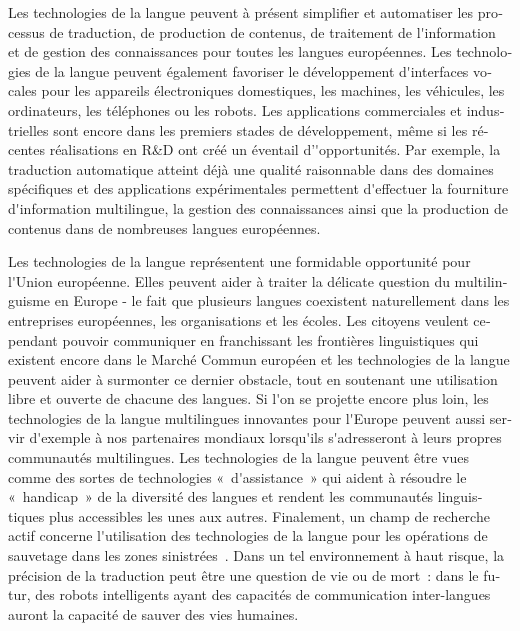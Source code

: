 \documentclass[]{../metanetpaper}
\begin{document}
\begin{french}
\begin{multicols}{2}
Les technologies de la langue peuvent à présent simplifier et
automatiser les processus de traduction, de production de contenus, de
traitement de l{\mbox '}information et de gestion des connaissances
pour toutes les langues européennes. Les technologies de la langue
peuvent également favoriser le développement d{\mbox '}interfaces
vocales pour les appareils électroniques domestiques, les machines,
les véhicules, les ordinateurs, les téléphones ou les robots. Les applications
commerciales et industrielles sont encore dans les premiers stades de
développement, même si les récentes réalisations en R\&D ont créé un
éventail d'{\mbox '}opportunités. Par exemple, la traduction
automatique atteint déjà une qualité raisonnable dans des domaines
spécifiques et des applications expérimentales permettent d{\mbox
 '}effectuer la fourniture d{\mbox '}information multilingue, la
gestion des connaissances ainsi que la production de contenus dans de
nombreuses langues européennes.


Les technologies de la langue représentent une formidable opportunité
pour l{\mbox '}Union européenne. Elles peuvent aider à traiter la
délicate question du multilinguisme en Europe - le fait que plusieurs
langues coexistent naturellement dans les entreprises européennes, les
organisations et les écoles. Les citoyens veulent cependant pouvoir
communiquer en franchissant les frontières linguistiques qui existent
encore dans le Marché Commun européen et les technologies de la langue
peuvent aider à surmonter ce dernier obstacle, tout en soutenant une
utilisation libre et ouverte de chacune des langues. Si l{\mbox '}on
se projette encore plus loin, les technologies de la langue
multilingues innovantes pour l{\mbox '}Europe peuvent aussi servir
d{\mbox '}exemple à nos partenaires mondiaux lorsqu{\mbox '}ils
s{\mbox '}adresseront à leurs propres communautés multilingues. Les
technologies de la langue peuvent être vues comme des sortes de
technologies «~d{\mbox '}assistance~» qui aident à résoudre le
«~handicap~» de la diversité des langues et rendent les communautés
linguistiques plus accessibles les unes aux autres. Finalement, un
champ de recherche actif concerne l{\mbox '}utilisation des
technologies de la langue pour les opérations de sauvetage dans les
zones sinistrées~\cite{resnick2011}. Dans un tel environnement à haut
risque, la précision de la traduction peut être une question de vie ou
de mort~: dans le futur, des robots intelligents ayant des capacités
de communication inter-langues auront la capacité de sauver des vies
humaines.


\end{multicols}
\end{french}
\end{document}
